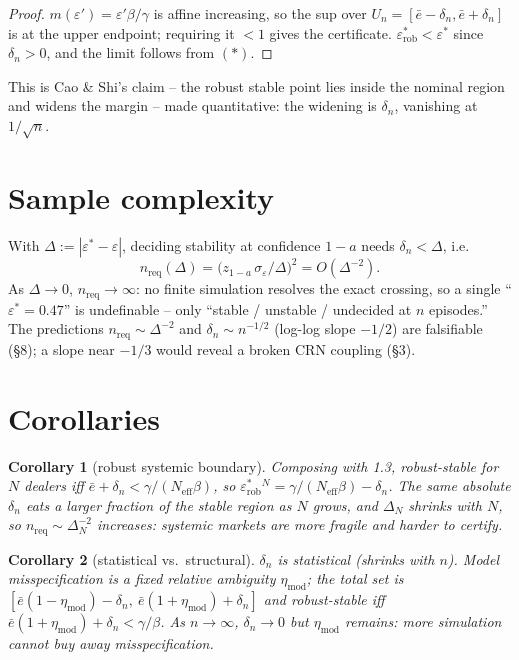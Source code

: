\documentclass[11pt]{article}
\newtheorem{corollary}{Corollary}
\newcommand{\eps}{\varepsilon}
\newcommand{\dn}{\delta_n}
\newcommand{\Neff}{N_{\mathrm{eff}}}
\newcommand{\epsstar}{\eps^{*}}
\newcommand{\epsrob}{\eps^{*}_{\mathrm{rob}}}
\newcommand{\ebar}{\bar e}
\begin{document}
\begin{proof}
$m(\eps')=\eps'\beta/\gamma$ is affine increasing, so the sup over
$U_n=[\ebar-\dn,\ebar+\dn]$ is at the upper endpoint; requiring it $<1$ gives the
certificate. $\epsrob<\epsstar$ since $\dn>0$, and the limit follows from $(*)$.
\end{proof}

\noindent This is Cao \& Shi's claim -- the robust stable point lies inside the
nominal region and widens the margin -- made quantitative: the widening is $\dn$,
vanishing at $1/\sqrt{n}$.

\section{Sample complexity}

With $\Delta:=|\epsstar-\eps|$, deciding stability at confidence $1-a$ needs
$\dn<\Delta$, i.e.
%
\begin{equation}
  n_{\mathrm{req}}(\Delta)=\big(z_{1-a}\,\sigma_\eps/\Delta\big)^2=O(\Delta^{-2}).
\end{equation}
%
As $\Delta\to0$, $n_{\mathrm{req}}\to\infty$: no finite simulation resolves the
exact crossing, so a single ``$\epsstar=0.47$'' is undefinable -- only ``stable /
unstable / undecided at $n$ episodes.'' The predictions $n_{\mathrm{req}}\sim\Delta^{-2}$
and $\dn\sim n^{-1/2}$ (log-log slope $-1/2$) are falsifiable (\S8); a slope near
$-1/3$ would reveal a broken CRN coupling (\S3).

\section{Corollaries}

\begin{corollary}[robust systemic boundary]
Composing with 1.3, robust-stable for $N$ dealers iff $\ebar+\dn<\gamma/(\Neff\beta)$,
so $\epsrob^{N}=\gamma/(\Neff\beta)-\dn$. The same absolute $\dn$ eats a larger
fraction of the stable region as $N$ grows, and $\Delta_N$ shrinks with $N$, so
$n_{\mathrm{req}}\sim\Delta_N^{-2}$ \emph{increases}: systemic markets are more
fragile \emph{and} harder to certify.
\end{corollary}

\begin{corollary}[statistical vs.\ structural]
$\dn$ is statistical (shrinks with $n$). Model misspecification is a fixed relative
ambiguity $\eta_{\mathrm{mod}}$; the total set is
$[\ebar(1-\eta_{\mathrm{mod}})-\dn,\ \ebar(1+\eta_{\mathrm{mod}})+\dn]$ and
robust-stable iff $\ebar(1+\eta_{\mathrm{mod}})+\dn<\gamma/\beta$. As $n\to\infty$,
$\dn\to0$ but $\eta_{\mathrm{mod}}$ remains: more simulation cannot buy away
misspecification.
\end{corollary}
\end{document}
